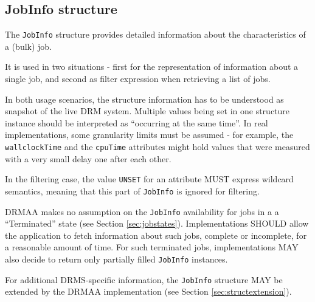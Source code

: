 \documentclass{article}
\newcommand{\h}[1]{\lstinline|#1|}
\newcommand{\rat}[1]{}
\begin{document}
\subsection{JobInfo structure}
\label{sec:jobinfo}

The \h{JobInfo} structure provides detailed information about the characteristics of a (bulk) job.



It is used in two situations - first for the representation of information about a single job, and second as filter expression when retrieving a list of jobs.

In both usage scenarios, the structure information has to be understood as snapshot of the live DRM system. Multiple values being set in one structure instance should be interpreted as \enquote{occurring at the same time}. In real implementations, some granularity limits must be assumed - for example, the \h{wallclockTime} and the \h{cpuTime} attributes might hold values that were measured with a very small delay one after each other.

In the filtering case, the value \h{UNSET} for an attribute MUST express wildcard semantics, meaning that this part of \h{JobInfo} is ignored for filtering.

DRMAA makes no assumption on the \h{JobInfo} availability for jobs in a a \enquote{Terminated} state (see Section \ref{sec:jobstates}). Implementations SHOULD allow the application to fetch information about such jobs, complete or incomplete, for a reasonable amount of time. For such terminated jobs, implementations MAY also decide to return only partially filled \h{JobInfo} instances.

\rat{We want to tackle performance restrictions in the communication with the DRM system by this.}

For additional DRMS-specific information, the \h{JobInfo} structure MAY be extended by the DRMAA implementation (see Section \ref{sec:structextension}).

\rat{
In comparison to DRMAA 1.0, the JobInfo value type was heavily extended for providing more information (solves issue \#2827). JobInfo::hasCoreDump is no longer supported, since the information is useless without according core file staging support, which is not implementable in a portable way. (conf. call Jun 9th 2010) resourceUsage is no longer supported, since this should be modeled with implementation-specific attributes (conf call Apr 13th 2011).

Some DRM systems (SGE / Condor at least) support the automated modification of job template attributes after submission, and therefore allow to fetch the true job template attributes at run-time from the job. The monitoring for such data was intentionally not included in DRMAA (mailing list July 2010).

A comment attribute was rejected (conf call May 11th).

Several conf. calls in 2011 ended up in the conclusion that data reaping cannot be clarified by DRMAA. There are too many completely different use cases in local and distributed systems. 
}	
\end{document}
